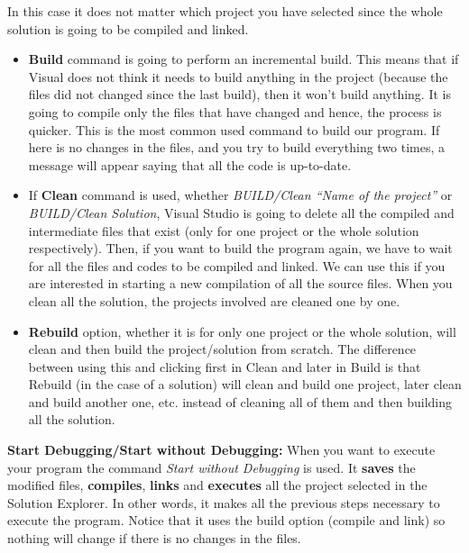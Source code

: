 \begin{enumerate}
    In this case it does not matter which project you have selected since the whole solution is going to be compiled and linked. 
    
    \begin{IN}
        \begin{itemize}
            \item \textbf{Build} command is going to perform an incremental build. This means that if Visual does not think it needs to build anything in the project (because the files did not changed since the last build), then it won't build anything. It is going to compile only the files that have changed and hence, the process is quicker. This is the most common used command to build our program. If here is no changes in the files, and you try to build everything two times, a message will appear saying that all the code is up-to-date.
            
            \item If \textbf{Clean} command is used, whether \textit{BUILD/Clean ``Name of the project''} or \textit{BUILD/Clean Solution}, Visual Studio is going to delete all the compiled and intermediate files that exist (only for one project or the whole solution respectively). Then, if you want to build the program again, we have to wait for all the files and codes to be compiled and linked. We can use this if you are interested in starting a new compilation of all the source files. When you clean all the solution, the projects involved are cleaned one by one.
            
            \item \textbf{Rebuild} option, whether it is for only one project or the whole solution, will clean and then build the project/solution from scratch. The difference between using this and clicking first  in Clean and later in Build is that Rebuild (in the case of a solution) will clean and build one project, later clean and build another one, etc. instead of cleaning all of them and then building all the solution.
        \end{itemize}    
    \end{IN}
    
    \textbf{Start Debugging/Start without Debugging:} When you want to execute your program the command \textit{Start without Debugging} is used. It \textbf{saves} the modified files, \textbf{compiles}, \textbf{links} and \textbf{executes} all the project selected in the Solution Explorer. In other words, it makes all the previous steps necessary to execute the program. Notice that it uses the build option (compile and link) so nothing will change if there is no changes in the files. 
    

\end{enumerate}
